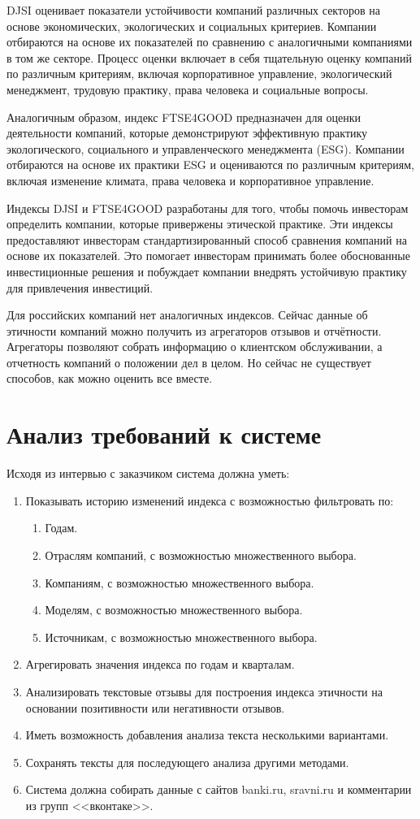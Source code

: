 \documentclass[PI, VKR]{HSEUniversity}
\begin{document}
DJSI оценивает показатели устойчивости компаний различных секторов на основе экономических, экологических и социальных критериев. Компании отбираются на основе их показателей по сравнению с аналогичными компаниями в том же секторе. Процесс оценки включает в себя тщательную оценку компаний по различным критериям, включая корпоративное управление, экологический менеджмент, трудовую практику, права человека и социальные вопросы.

Аналогичным образом, индекс FTSE4GOOD предназначен для оценки деятельности компаний, которые демонстрируют эффективную практику экологического, социального и управленческого менеджмента (ESG). Компании отбираются на основе их практики ESG и оцениваются по различным критериям, включая изменение климата, права человека и корпоративное управление.

Индексы DJSI и FTSE4GOOD разработаны для того, чтобы помочь инвесторам определить компании, которые привержены этической практике. Эти индексы предоставляют инвесторам стандартизированный способ сравнения компаний на основе их показателей. Это помогает инвесторам принимать более обоснованные инвестиционные решения и побуждает компании внедрять устойчивую практику для привлечения инвестиций.

Для российских компаний нет аналогичных индексов. Сейчас данные об этичности компаний можно получить из агрегаторов отзывов и отчётности. Агрегаторы позволяют собрать информацию о клиентском обслуживании, а отчетность компаний о положении дел в целом. Но сейчас не существует способов, как можно оценить все вместе.
\section{Анализ требований к системе}
\label{sec:org900de53}
Исходя из интервью с заказчиком система должна уметь:

\begin{enumerate}
\item Показывать историю изменений индекса с возможностью фильтровать по:
\begin{enumerate}
\item Годам.
\item Отраслям компаний, с возможностью множественного выбора.
\item Компаниям, с возможностью множественного выбора.
\item Моделям, с возможностью множественного выбора.
\item Источникам, с возможностью множественного выбора.
\end{enumerate}
\item Агрегировать значения индекса по годам и кварталам.
\item Анализировать текстовые отзывы для построения индекса этичности на основании позитивности или негативности отзывов.
\item Иметь возможность добавления анализа текста несколькими вариантами.
\item Сохранять тексты для последующего анализа другими методами.
\item Система должна собирать данные с сайтов banki.ru, sravni.ru и комментарии из групп {}<<вконтаке>>{}.
\end{enumerate}
\end{document}
